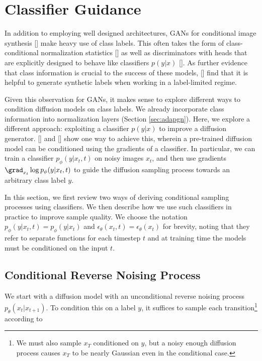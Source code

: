 \section{Classifier Guidance}
\label{sec:guidance}

In addition to employing well designed architectures, GANs for conditional image synthesis [] make heavy use of class labels. This often takes the form of class-conditional normalization statistics [] as well as discriminators with heads that are explicitly designed to behave like classifiers $p(y|x)$ []. As further evidence that class information is crucial to the success of these models, \citeauthor{unlabeledgan} [] find that it is helpful to generate synthetic labels when working in a label-limited regime.

Given this observation for GANs, it makes sense to explore different ways to condition diffusion models on class labels. We already incorporate class information into normalization layers (Section \ref{sec:adapgn}). Here, we explore a different approach: exploiting a classifier $p(y|x)$ to improve a diffusion generator. \citeauthor{dickstein} [] and \citeauthor{sde} [] show one way to achieve this, wherein a pre-trained diffusion model can be conditioned using the gradients of a classifier. In particular, we can train a classifier $p_{\phi}(y|x_t,t)$ on noisy images $x_t$, and then use gradients $\grad_{x_t} \log p_{\phi}(y|x_t,t)$ to guide the diffusion sampling process towards an arbitrary class label $y$.

In this section, we first review two ways of deriving conditional sampling processes using classifiers. We then describe how we use such classifiers in practice to improve sample quality. We choose the notation $p_{\phi}(y|x_t,t) = p_{\phi}(y|x_t)$ and $\epsilon_\theta(x_t,t) = \epsilon_\theta(x_t)$ for brevity, noting that they refer to separate functions for each timestep $t$ and at training time the models must be conditioned on the input $t$. 

\subsection{Conditional Reverse Noising Process}

We start with a diffusion model with an unconditional reverse noising process $p_{\theta}(x_t|x_{t+1})$. To condition this on a label $y$, it suffices to sample each transition\footnote{We must also sample $x_T$ conditioned on $y$, but a noisy enough diffusion process causes $x_T$ to be nearly Gaussian even in the conditional case.} according to

